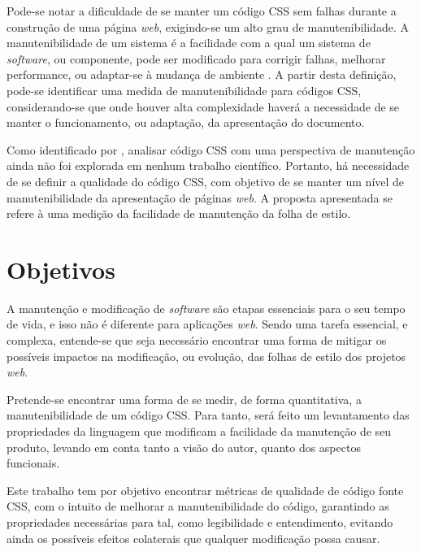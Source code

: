 Pode-se notar a dificuldade de se manter um código CSS sem falhas durante a construção de uma página \textit{web}, exigindo-se um alto grau de manutenibilidade. A manutenibilidade de um sistema é a facilidade com a qual um sistema de \textit{software}, ou componente, pode ser modificado para corrigir falhas, melhorar performance, ou adaptar-se à mudança de ambiente \cite{Ieee1990}. A partir desta definição, pode-se identificar uma medida de manutenibilidade para códigos CSS, considerando-se que onde houver alta complexidade haverá a necessidade de se manter o funcionamento, ou adaptação, da apresentação do documento.

Como identificado por , analisar código CSS com uma perspectiva de manutenção ainda não foi explorada em nenhum trabalho científico. Portanto, há necessidade de se definir a qualidade do código CSS, com objetivo de se manter um nível de manutenibilidade da apresentação de páginas \textit{web}. A proposta apresentada se refere à uma medição da facilidade de manutenção da folha de estilo.


\section{Objetivos}
\label{sec:obj}

A manutenção e modificação de \textit{software} são etapas essenciais para o seu tempo de vida, e isso não é diferente para aplicações \textit{web}. Sendo uma tarefa essencial, e complexa, entende-se que seja necessário encontrar uma forma de mitigar os possíveis impactos na modificação, ou evolução, das folhas de estilo dos projetos \textit{web}.

Pretende-se encontrar uma forma de se medir, de forma quantitativa, a manutenibilidade de um código CSS. Para tanto, será feito um levantamento das propriedades da linguagem que modificam a facilidade da manutenção de seu produto, levando em conta tanto a visão do autor, quanto dos aspectos funcionais.

Este trabalho tem por objetivo encontrar métricas de qualidade de código fonte CSS, com o intuito de melhorar a manutenibilidade do código, garantindo as propriedades necessárias para tal, como legibilidade e entendimento, evitando ainda os possíveis efeitos colaterais que qualquer modificação possa causar.